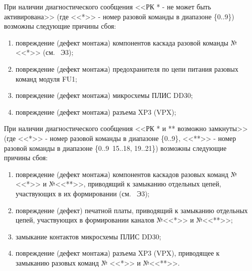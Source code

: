   \begin{sloppypar}  
    \subpoint При наличии диагностического сообщения <<РК * - не может быть активирована>> 
	      (где <<*>> - номер разовой команды в диапазоне \{0..9\}) возможны следующие причины сбоя:
      \begin{enumerate}
	\item повреждение (дефект монтажа) компонентов каскада разовой команды № <<*>> (см. \DocProductSignature~Э3);
	\item повреждение (дефект монтажа) предохранителя по цепи питания разовых команд модуля FU1;
	\item повреждение (дефект монтажа) микросхемы ПЛИС DD30;
	\item повреждение (дефект монтажа) разъема XP3 (VPX);
      \end{enumerate}
      
      \subpoint При наличии диагностического сообщения <<РК * и ** возможно замкнуты>> 
		(где <<*>> - номер разовой команды в диапазоне \{0..9\}, <<**>> - номер разовой команды в диапазоне \{0..9\, 15..18, 19..21\}) возможны следующие причины сбоя:
      \begin{enumerate}
	\item повреждение (дефект монтажа) компонентов каскадов разовых команд № <<*>> и №<<**>>, 
	      приводящий к замыканию отдельных цепей, участвующих в их формировании (см. \DocProductSignature~Э3);
	\item повреждение (дефект) печатной платы, приводящий к замыканию отдельных цепей, участвующих в формировании каналов №<<*>> и №<<**>>;
	\item замыкание контактов микросхемы ПЛИС DD30;
	\item повреждение (дефект монтажа) разъема XP3 (VPX), приводящее к замыканию разовых команд № <<*>> и №<<**>>.
      \end{enumerate}
      
  \end{sloppypar}
  
